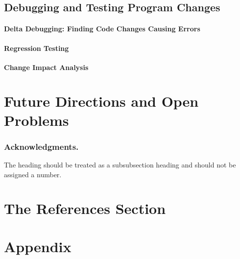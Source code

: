 \documentclass[runningheads,a4paper]{llncs}
\begin{document}
\subsection{Debugging and Testing Program Changes} 

\paragraph{Delta Debugging: Finding Code Changes Causing Errors}
\paragraph{Regression Testing} 
\paragraph{Change Impact Analysis} 

\section{Future Directions and Open Problems} 



\subsubsection*{Acknowledgments.} The heading should be treated as a
subsubsection heading and should not be assigned a number.

\section{The References Section}\label{references}



\section*{Appendix} 
\end{document}
